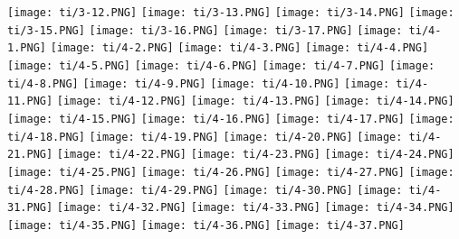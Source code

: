 \documentclass[UTF-8]{ctexart}
\begin{document}
\begin{center}
\texttt{[image: ti/3-12.PNG]}
\texttt{[image: ti/3-13.PNG]}
\texttt{[image: ti/3-14.PNG]}
\texttt{[image: ti/3-15.PNG]}
\texttt{[image: ti/3-16.PNG]}
\texttt{[image: ti/3-17.PNG]}
\newpage
\texttt{[image: ti/4-1.PNG]}
\texttt{[image: ti/4-2.PNG]}
\texttt{[image: ti/4-3.PNG]}
\texttt{[image: ti/4-4.PNG]}
\texttt{[image: ti/4-5.PNG]}
\texttt{[image: ti/4-6.PNG]}
\texttt{[image: ti/4-7.PNG]}
\texttt{[image: ti/4-8.PNG]}
\texttt{[image: ti/4-9.PNG]}
\texttt{[image: ti/4-10.PNG]}
\texttt{[image: ti/4-11.PNG]}
\texttt{[image: ti/4-12.PNG]}
\texttt{[image: ti/4-13.PNG]}
\texttt{[image: ti/4-14.PNG]}
\texttt{[image: ti/4-15.PNG]}
\texttt{[image: ti/4-16.PNG]}
\texttt{[image: ti/4-17.PNG]}
\texttt{[image: ti/4-18.PNG]}
\texttt{[image: ti/4-19.PNG]}
\texttt{[image: ti/4-20.PNG]}
\texttt{[image: ti/4-21.PNG]}
\texttt{[image: ti/4-22.PNG]}
\texttt{[image: ti/4-23.PNG]}
\texttt{[image: ti/4-24.PNG]}
\texttt{[image: ti/4-25.PNG]}
\texttt{[image: ti/4-26.PNG]}
\texttt{[image: ti/4-27.PNG]}
\texttt{[image: ti/4-28.PNG]}
\texttt{[image: ti/4-29.PNG]}
\texttt{[image: ti/4-30.PNG]}
\texttt{[image: ti/4-31.PNG]}
\texttt{[image: ti/4-32.PNG]}
\texttt{[image: ti/4-33.PNG]}
\texttt{[image: ti/4-34.PNG]}
\texttt{[image: ti/4-35.PNG]}
\texttt{[image: ti/4-36.PNG]}
\texttt{[image: ti/4-37.PNG]}
\end{center}
\end{document}
